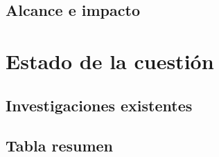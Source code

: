 \subsection{Alcance e impacto}
\section{Estado de la cuestión}
\subsection{Investigaciones existentes}
\subsection{Tabla resumen}
